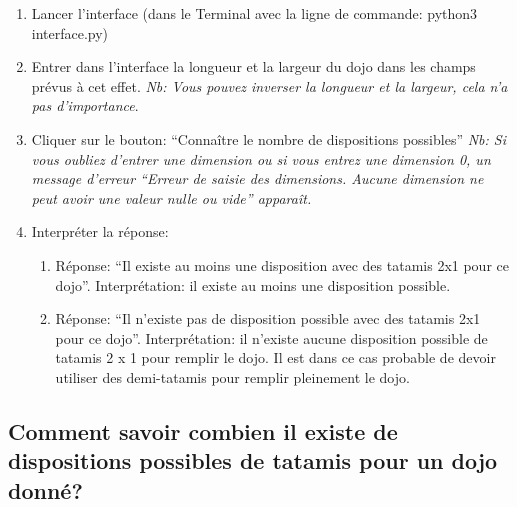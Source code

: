\begin{enumerate}
    \item Lancer l’interface (dans le Terminal avec la ligne de commande: python3 interface.py)
    \item Entrer dans l’interface la longueur et la largeur du dojo dans les champs prévus à cet effet.
          \emph{Nb: Vous pouvez inverser la longueur et la largeur, cela n’a pas d’importance}.
    \item Cliquer sur le bouton: “Connaître le nombre de dispositions possibles” \emph{Nb: Si vous oubliez d’entrer une dimension ou
              si vous entrez une dimension 0, un message d’erreur “Erreur de saisie des dimensions.
              Aucune dimension ne peut avoir une valeur nulle ou vide” apparaît.}
    \item Interpréter la réponse:
          \begin{enumerate}
              \item     Réponse: “Il existe au moins une disposition avec des tatamis 2x1 pour ce dojo”.
                    Interprétation: il existe au moins une disposition possible.
              \item     Réponse: “Il n’existe pas de disposition possible avec des tatamis 2x1 pour ce dojo”.
                    Interprétation: il n’existe aucune disposition possible de tatamis 2 x 1 pour remplir le dojo.
                    Il est dans ce cas probable de devoir utiliser des demi-tatamis pour remplir pleinement le dojo.
          \end{enumerate}

\end{enumerate}

\subsection{Comment savoir combien il existe de dispositions possibles de tatamis pour un dojo donné?}


